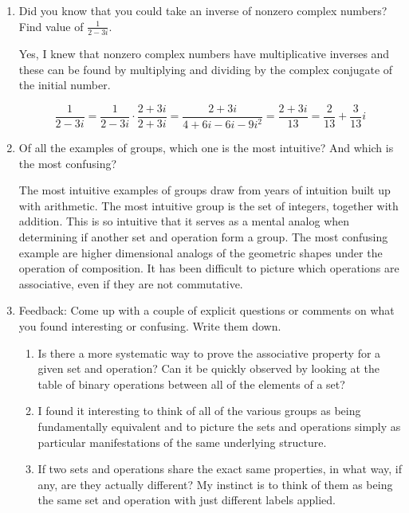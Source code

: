 \documentclass{article}
\begin{document}
\begin{enumerate}
\item Did you know that you could take an inverse of nonzero complex numbers? Find value of $\frac{1}{2-3i}$.

\begin{flushleft}
Yes, I knew that nonzero complex numbers have multiplicative inverses and these can be found by multiplying and dividing by the complex conjugate of the initial number.

$$\frac{1}{2-3i} = \frac{1}{2-3i} \cdot \frac{2+3i}{2+3i} = \frac{2+3i}{4 + 6i - 6i - 9i^2} = \frac{2+3i}{13} = \frac{2}{13} + \frac{3}{13}i$$
\end{flushleft}

\newpage
\item Of all the examples of groups, which one is the most intuitive? And which is the most confusing?

\begin{flushleft}
The most intuitive examples of groups draw from years of intuition built up with arithmetic. The most intuitive group is the set of integers, together with addition. This is so intuitive that it serves as a mental analog when determining if another set and operation form a group. The most confusing example are higher dimensional analogs of the geometric shapes under the operation of composition. It has been difficult to picture which operations are associative, even if they are not commutative.
\end{flushleft}

\item Feedback: Come up with a couple of explicit questions or comments on what you found interesting or confusing. Write them down.

\begin{flushleft}
\begin{enumerate}
    \item Is there a more systematic way to prove the associative property for a given set and operation? Can it be quickly observed by looking at the table of binary operations between all of the elements of a set?
    \item I found it interesting to think of all of the various groups as being fundamentally equivalent and to picture the sets and operations simply as particular manifestations of the same underlying structure.
    \item If two sets and operations share the exact same properties, in what way, if any, are they actually different? My instinct is to think of them as being the same set and operation with just different labels applied.
\end{enumerate}
\end{flushleft}
\end{enumerate}
\end{document}
